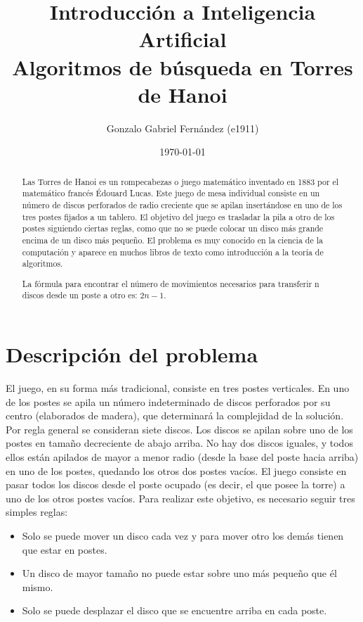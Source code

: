 \documentclass[onecolumn]{IEEEtran}
\title{Introducción a Inteligencia Artificial\\Algoritmos de búsqueda en Torres de Hanoi}
\author{Gonzalo Gabriel Fernández (e1911)}
\date{\today}
\begin{document}
\maketitle

\begin{abstract}
Las Torres de Hanoi es un rompecabezas o juego matemático inventado en 1883 por el matemático francés Édouard Lucas. Este juego de mesa individual consiste en un número de discos perforados de radio creciente que se apilan insertándose en uno de los tres postes fijados a un tablero. El objetivo del juego es trasladar la pila a otro de los postes siguiendo ciertas reglas, como que no se puede colocar un disco más grande encima de un disco más pequeño. El problema es muy conocido en la ciencia de la computación y aparece en muchos libros de texto como introducción a la teoría de algoritmos.

La fórmula para encontrar el número de movimientos necesarios para transferir n discos desde un poste a otro es: $2n - 1$. 
\end{abstract}

\section{Descripción del problema}
El juego, en su forma más tradicional, consiste en tres postes verticales. En uno de los postes se apila un número indeterminado de discos perforados por su centro (elaborados de madera), que determinará la complejidad de la solución. Por regla general se consideran siete discos. Los discos se apilan sobre uno de los postes en tamaño decreciente de abajo arriba. No hay dos discos iguales, y todos ellos están apilados de mayor a menor radio (desde la base del poste hacia arriba) en uno de los postes, quedando los otros dos postes vacíos. El juego consiste en pasar todos los discos desde el poste ocupado (es decir, el que posee la torre) a uno de los otros postes vacíos. Para realizar este objetivo, es necesario seguir tres simples reglas:

\begin{itemize}
    \item Solo se puede mover un disco cada vez y para mover otro los demás tienen que estar en postes.
    \item Un disco de mayor tamaño no puede estar sobre uno más pequeño que él mismo.
    \item Solo se puede desplazar el disco que se encuentre arriba en cada poste.
\end{itemize}
\end{document}
